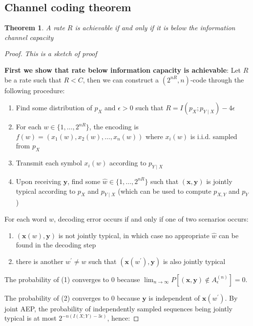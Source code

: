 \documentclass{article}
\newtheorem{theorem}{Theorem}[section]
\begin{document}
    \subsection{Channel coding theorem}
    \begin{theorem}
        A rate $R$ is achievable if and only if it is below the information channel capacity
    \end{theorem}
    \begin{proof}
        \textit{This is a sketch of proof}
        
        \textbf{First we show that rate below information capacity is achievable}:
        Let $R$ be a rate such that $R < C$, then we can construct a $(2^{nR}, n)$-code through the following procedure:
        \begin{enumerate}
            \item Find some distribution of $p_X$ and $\epsilon > 0$ such that $R = I(p_X;p_{Y \mid X}) - 4\epsilon$
            \item For each $w \in \{1, \ldots, 2^{nR}\}$, the encoding is $f(w) = (x_1(w), x_2(w), \ldots, x_n(w))$ where $x_i(w)$ is i.i.d. sampled from $p_X$
            \item Transmit each symbol $x_i(w)$ according to $p_{Y \mid X}$
            \item Upon receiving $\mathbf{y}$, find some $\hat{w} \in \{1, \ldots, 2^{nR}\}$ such that $(\mathbf{x}, \mathbf{y})$ is jointly typical according to $p_X$ and $p_{Y \mid X}$ (which can be used to compute $p_{X, Y}$ and $p_Y$)
        \end{enumerate}

        For each word $w$, decoding error occurs if and only if one of two scenarios occurs:

        \begin{enumerate}
            \item $(\mathbf{x}(w), \mathbf{y})$ is not jointly typical, in which case no appropriate $\hat{w}$ can be found in the decoding step
            \item there is another $w^\prime \neq w$ such that $(\mathbf{x}(w^\prime), \mathbf{y})$ is also jointly typical
        \end{enumerate}

        The probability of (1) converges to 0 because $\lim_{n \rightarrow \infty}P[(\mathbf{x}, \mathbf{y}) \not \in A_\epsilon^{(n)}] = 0$.

        The probability of (2) converges to 0 because $\mathbf{y}$ is independent of $\mathbf{x}(w^\prime)$. By joint AEP, the probability of independently sampled sequences being jointly typical is at most $2^{-n(I(X; Y) - 3\epsilon)}$, hence:


\end{proof}
\end{document}
